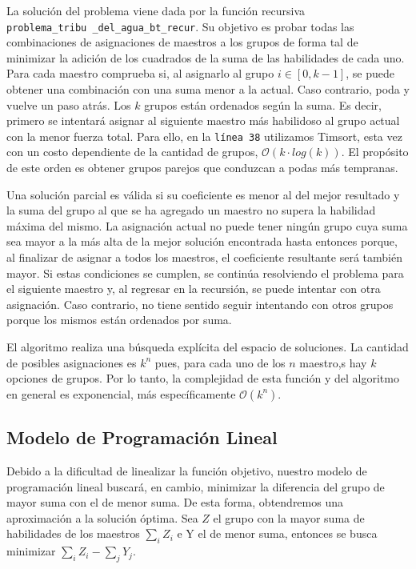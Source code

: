 \documentclass{article}
\begin{document}
\inputminted[linenos, firstline=30, lastline=71]{python}{codigo/backtracking_con_greedy.py}

La solución del problema viene dada por la función recursiva \texttt{problema\_tribu\
\_del\_agua\_bt\_recur}.  Su objetivo es probar todas las combinaciones de asignaciones de maestros a los grupos de forma tal de minimizar la adición de los cuadrados de la suma de las habilidades de cada uno. Para cada maestro comprueba si, al asignarlo al grupo $i \in [0, k-1]$, se puede obtener una combinación con una suma menor a la actual. Caso contrario, poda y vuelve un paso atrás. Los $k$ grupos están ordenados según la suma. Es decir, primero se intentará asignar al siguiente maestro más habilidoso al grupo actual con la menor fuerza total. Para ello, en la \texttt{línea 38} utilizamos Timsort, esta vez con un costo dependiente de la cantidad de grupos, $\mathcal{O}(k \cdot log(k))$. El propósito de este orden es obtener grupos parejos que conduzcan a podas más tempranas.

Una solución parcial es válida si su coeficiente es menor al del mejor resultado y la suma del grupo al que se ha agregado un maestro no supera la habilidad máxima del mismo. La asignación actual no puede tener ningún grupo cuya suma sea mayor a la más alta de la mejor solución encontrada hasta entonces porque, al finalizar de asignar a todos los maestros, el coeficiente resultante será también mayor. Si estas condiciones se cumplen, se continúa resolviendo el problema para el siguiente maestro y, al regresar en la recursión, se puede intentar con otra asignación. Caso contrario, no tiene sentido seguir intentando con otros grupos porque los mismos están ordenados por suma.

El algoritmo realiza una búsqueda explícita del espacio de soluciones. La cantidad de posibles asignaciones es $k^n$ pues, para cada uno de los $n$ maestro,s hay $k$ opciones de grupos. Por lo tanto, la complejidad de esta función y del algoritmo en general es exponencial, más específicamente $\mathcal{O}(k^n)$.

\subsection{Modelo de Programación Lineal}

Debido a la dificultad de linealizar la función objetivo, nuestro modelo de programación lineal buscará, en cambio, minimizar la diferencia del grupo de mayor suma con el de menor suma. De esta forma, obtendremos una aproximación a la solución óptima. Sea $Z$ el grupo con la mayor suma de habilidades de los maestros \(\sum_{i} Z_i\) e Y el de menor suma, entonces se busca minimizar \(\sum_{i} Z_i - \sum_{j} Y_j\).
\end{document}
